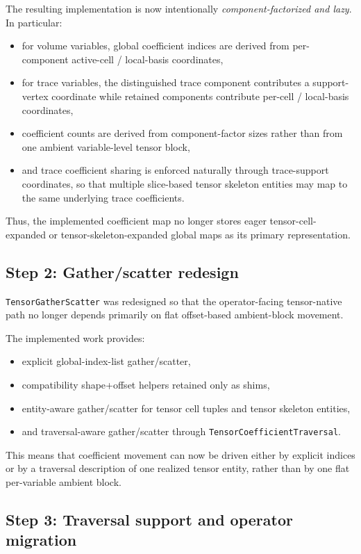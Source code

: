 \documentclass[11pt]{article}
\begin{document}
The resulting implementation is now intentionally \emph{component-factorized and lazy}.  In particular:
\begin{itemize}[leftmargin=2em]
\item for volume variables, global coefficient indices are derived from per-component active-cell / local-basis coordinates,
\item for trace variables, the distinguished trace component contributes a support-vertex coordinate while retained components contribute per-cell / local-basis coordinates,
\item coefficient counts are derived from component-factor sizes rather than from one ambient variable-level tensor block,
\item and trace coefficient sharing is enforced naturally through trace-support coordinates, so that multiple slice-based tensor skeleton entities may map to the same underlying trace coefficients.
\end{itemize}

Thus, the implemented coefficient map no longer stores eager tensor-cell-expanded or tensor-skeleton-expanded global maps as its primary representation.

\subsection{Step 2: Gather/scatter redesign}

\texttt{TensorGatherScatter} was redesigned so that the operator-facing tensor-native path no longer depends primarily on flat offset-based ambient-block movement.

The implemented work provides:
\begin{itemize}[leftmargin=2em]
\item explicit global-index-list gather/scatter,
\item compatibility shape+offset helpers retained only as shims,
\item entity-aware gather/scatter for tensor cell tuples and tensor skeleton entities,
\item and traversal-aware gather/scatter through \texttt{TensorCoefficientTraversal}.
\end{itemize}

This means that coefficient movement can now be driven either by explicit indices or by a traversal description of one realized tensor entity, rather than by one flat per-variable ambient block.

\subsection{Step 3: Traversal support and operator migration}
\end{document}
